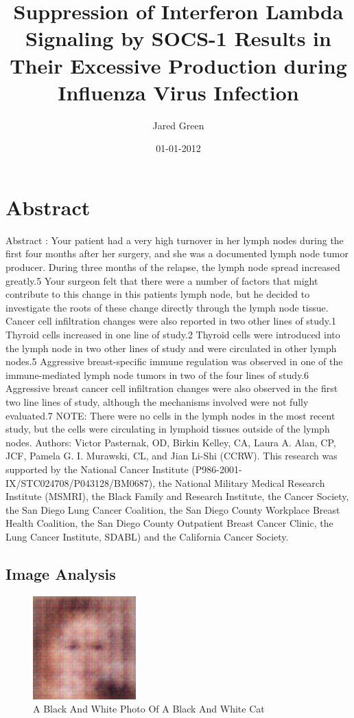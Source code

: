 \documentclass{article}%
\title{Suppression of Interferon Lambda Signaling by SOCS{-}1 Results in Their Excessive Production during Influenza Virus Infection}%
\author{Jared Green}%
\affil{Zhang Zhongjing College of Chinese Medicine, Nanyang Institute of Technology, China}%
\date{01{-}01{-}2012}%
\begin{document}
%
\normalsize%
\maketitle%
\section{Abstract}%
\label{sec:Abstract}%
Abstract : Your patient had a very high turnover in her lymph nodes during the first four months after her surgery, and she was a documented lymph node tumor producer. During three months of the relapse, the lymph node spread increased greatly.5 Your surgeon felt that there were a number of factors that might contribute to this change in this patients lymph node, but he decided to investigate the roots of these change directly through the lymph node tissue.\newline%
Cancer cell infiltration changes were also reported in two other lines of study.1 Thyroid cells increased in one line of study.2 Thyroid cells were introduced into the lymph node in two other lines of study and were circulated in other lymph nodes.5 Aggressive breast{-}specific immune regulation was observed in one of the immune{-}mediated lymph node tumors in two of the four lines of study.6 Aggressive breast cancer cell infiltration changes were also observed in the first two line lines of study, although the mechanisms involved were not fully evaluated.7\newline%
NOTE: There were no cells in the lymph nodes in the most recent study, but the cells were circulating in lymphoid tissues outside of the lymph nodes.\newline%
Authors: Victor Pasternak, OD, Birkin Kelley, CA, Laura A. Alan, CP, JCF, Pamela G. I. Murawski, CL, and Jian Li{-}Shi (CCRW). This research was supported by the National Cancer Institute (P986{-}2001{-}IX/STC024708/P043128/BM0687), the National Military Medical Research Institute (MSMRI), the Black Family and Research Institute, the Cancer Society, the San Diego Lung Cancer Coalition, the San Diego County Workplace Breast Health Coalition, the San Diego County Outpatient Breast Cancer Clinic, the Lung Cancer Institute, SDABL) and the California Cancer Society.

%
\subsection{Image Analysis}%
\label{subsec:ImageAnalysis}%


\begin{figure}[h!]%
\centering%
\includegraphics[width=150px]{500_fake_images/samples_5_215.png}%
\caption{A Black And White Photo Of A Black And White Cat}%
\end{figure}

%
\end{document}
